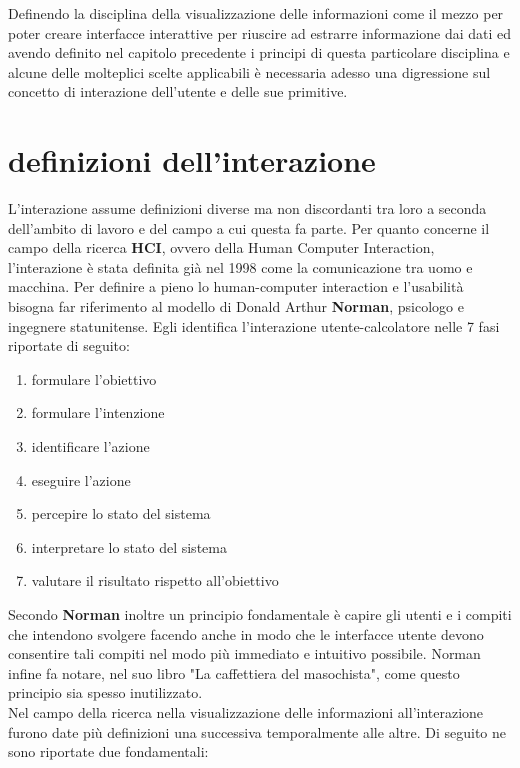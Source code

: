 \large{
Definendo la disciplina della visualizzazione delle informazioni come il mezzo per poter creare interfacce interattive per riuscire ad estrarre informazione dai dati ed avendo definito nel capitolo precedente i principi di questa particolare disciplina e alcune delle molteplici scelte applicabili è necessaria adesso una digressione sul concetto di interazione dell'utente e delle sue primitive.
\section{definizioni dell'interazione}
L'interazione assume definizioni diverse ma non discordanti tra loro a seconda dell'ambito di lavoro e del campo a cui questa fa parte. 
Per quanto concerne il campo della ricerca \textbf{HCI}, ovvero della Human Computer Interaction, l'interazione è stata definita già nel 1998 come la comunicazione tra uomo e macchina.
Per definire a pieno lo human-computer interaction e l'usabilità bisogna far riferimento al modello di Donald Arthur\textbf{ Norman}, psicologo e ingegnere statunitense. Egli identifica l'interazione utente-calcolatore nelle 7 fasi riportate di seguito: 
\begin{enumerate}
	\item formulare l'obiettivo
	\item formulare l'intenzione
	\item identificare l'azione
	\item eseguire l'azione
	\item percepire lo stato del sistema
	\item interpretare lo stato del sistema
	\item valutare il risultato rispetto all'obiettivo
\end{enumerate}
Secondo \textbf{Norman} inoltre un principio fondamentale è capire gli utenti e i compiti che intendono svolgere facendo anche in modo che le interfacce utente devono consentire tali compiti nel modo più immediato e intuitivo possibile. Norman infine fa notare, nel suo libro "La caffettiera del masochista", come questo principio sia spesso inutilizzato.\\
Nel campo della ricerca nella visualizzazione delle informazioni all'interazione furono date più definizioni una successiva temporalmente alle altre. Di seguito ne sono riportate due fondamentali:
}
